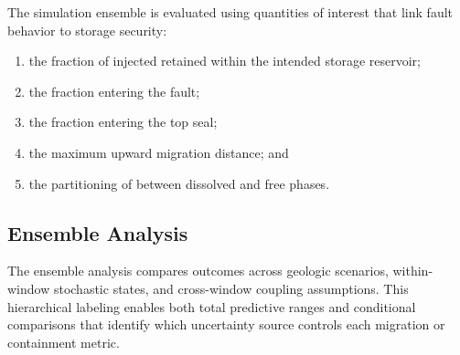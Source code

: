 The simulation ensemble is evaluated using quantities of interest that link
fault behavior to storage security:
\begin{enumerate}
  \item the fraction of injected \coTwo{} retained within the intended storage
  reservoir;
  \item the fraction entering the fault;
  \item the fraction entering the top seal;
  \item the maximum upward migration distance; and
  \item the partitioning of \coTwo{} between dissolved and free phases.
\end{enumerate}


\subsection{Ensemble Analysis}

The ensemble analysis compares outcomes across geologic scenarios, within-
window stochastic states, and cross-window coupling assumptions. This
hierarchical labeling enables both total predictive ranges and conditional
comparisons that identify which uncertainty source controls each migration or
containment metric.

